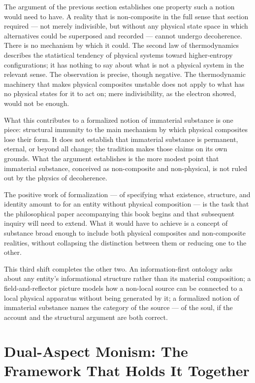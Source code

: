 The argument of the previous section establishes one property such a notion
would need to have. A reality that is non-composite in the full sense that
section required --- not merely indivisible, but without any physical state
space in which alternatives could be superposed and recorded --- cannot
undergo decoherence. There is no mechanism by which it could. The
second law of thermodynamics describes the statistical tendency of physical
systems toward higher-entropy configurations; it has nothing to say about what
is not a physical system in the relevant sense. The observation is precise,
though negative. The thermodynamic machinery that makes physical composites
unstable does not apply to what has no physical states for it to act on; mere
indivisibility, as the electron showed, would not be enough.

What this contributes to a formalized notion of immaterial substance is one
piece: structural immunity to the main mechanism by which physical composites
lose their form. It does not establish that immaterial substance is permanent,
eternal, or beyond all change; the \bahai tradition makes those claims on its
own grounds. What the argument establishes is the more modest point that
immaterial substance, conceived as non-composite and non-physical, is not ruled
out by the physics of decoherence.

The positive work of formalization --- of specifying what existence, structure,
and identity amount to for an entity without physical composition --- is the
task that the philosophical paper accompanying this book begins
\citep{AdamsThreePaths} and that subsequent inquiry will need to extend.
What it would have to achieve is a concept of substance broad enough to include both
physical composites and non-composite realities, without collapsing the
distinction between them or reducing one to the other.

This third shift completes the other two. An information-first ontology asks
about any entity's informational structure rather than its material
composition; a field-and-reflector picture models how a non-local source can be
connected to a local physical apparatus without being generated by it; a
formalized notion of immaterial substance names the category of the source ---
of the soul, if the \bahai account and the structural argument are both
correct.


\section{Dual-Aspect Monism: The Framework That Holds It Together}
\label{sec:dual-aspect}

